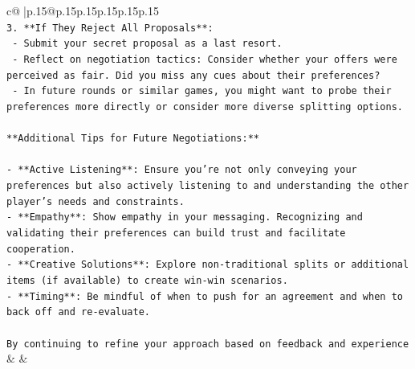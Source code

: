 \documentclass{article}
\begin{document}
{\begin{supertabular}{c@{$\;$}|p{.15\linewidth}@{}p{.15\linewidth}p{.15\linewidth}p{.15\linewidth}p{.15\linewidth}p{.15\linewidth}}
{{{\\ 
\texttt{3. **If They Reject All Proposals**:} \\
\texttt{   {-} Submit your secret proposal as a last resort.} \\
\texttt{   {-} Reflect on negotiation tactics: Consider whether your offers were perceived as fair. Did you miss any cues about their preferences?} \\
\texttt{   {-} In future rounds or similar games, you might want to probe their preferences more directly or consider more diverse splitting options.} \\
\\ 
\texttt{**Additional Tips for Future Negotiations:**} \\
\\ 
\texttt{{-} **Active Listening**: Ensure you're not only conveying your preferences but also actively listening to and understanding the other player's needs and constraints.} \\
\texttt{{-} **Empathy**: Show empathy in your messaging. Recognizing and validating their preferences can build trust and facilitate cooperation.} \\
\texttt{{-} **Creative Solutions**: Explore non{-}traditional splits or additional items (if available) to create win{-}win scenarios.} \\
\texttt{{-} **Timing**: Be mindful of when to push for an agreement and when to back off and re{-}evaluate.} \\
\\ 
\texttt{By continuing to refine your approach based on feedback and experience} \\
            }
        }
    }
    & & \\ \\


\end{supertabular}}
\end{document}
